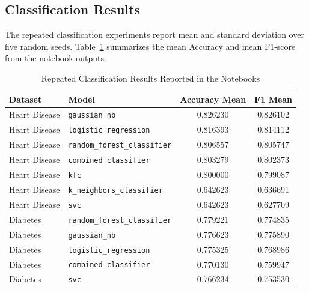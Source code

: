 \subsection{Classification Results}

The repeated classification experiments report mean and standard deviation over five random seeds. Table~\ref{tab:classification_summary} summarizes the mean Accuracy and mean F1-score from the notebook outputs.

\begin{table}[H]
    \centering
    \caption{Repeated Classification Results Reported in the Notebooks}
    \label{tab:classification_summary}
    \small
    \begin{tabular}{l l c c}
        \hline
        \textbf{Dataset} & \textbf{Model}                    & \textbf{Accuracy Mean} & \textbf{F1 Mean} \\
        \hline
        Heart Disease    & \texttt{gaussian\_nb}              & 0.826230               & 0.826102 \\
        Heart Disease    & \texttt{logistic\_regression}      & 0.816393               & 0.814112 \\
        Heart Disease    & \texttt{random\_forest\_classifier} & 0.806557               & 0.805747 \\
        Heart Disease    & \texttt{combined classifier}      & 0.803279               & 0.802373 \\
        Heart Disease    & \texttt{kfc}                      & 0.800000               & 0.799087 \\
        Heart Disease    & \texttt{k\_neighbors\_classifier}   & 0.642623               & 0.636691 \\
        Heart Disease    & \texttt{svc}                      & 0.642623               & 0.627709 \\
        \hline
        Diabetes         & \texttt{random\_forest\_classifier} & 0.779221               & 0.774835 \\
        Diabetes         & \texttt{gaussian\_nb}              & 0.776623               & 0.775890 \\
        Diabetes         & \texttt{logistic\_regression}      & 0.775325               & 0.768986 \\
        Diabetes         & \texttt{combined classifier}      & 0.770130               & 0.759947 \\
        Diabetes         & \texttt{svc}                      & 0.766234               & 0.753530 \\

\end{tabular}
\end{table}
